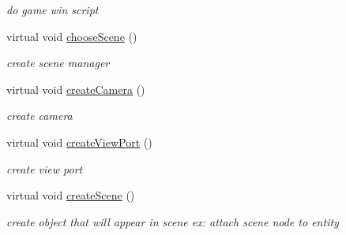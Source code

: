 \begin{DoxyCompactItemize}
\begin{DoxyCompactList}\small\item\em do game win script \end{DoxyCompactList}\item 
\hypertarget{class_stage3_ad5dbf1a992617368d059c960529db200}{
virtual void \hyperlink{class_stage3_ad5dbf1a992617368d059c960529db200}{chooseScene} ()}
\label{class_stage3_ad5dbf1a992617368d059c960529db200}

\begin{DoxyCompactList}\small\item\em create scene manager \end{DoxyCompactList}\item 
\hypertarget{class_stage3_ae5c7d751ff1b025a578c6f17aad30f3a}{
virtual void \hyperlink{class_stage3_ae5c7d751ff1b025a578c6f17aad30f3a}{createCamera} ()}
\label{class_stage3_ae5c7d751ff1b025a578c6f17aad30f3a}

\begin{DoxyCompactList}\small\item\em create camera \end{DoxyCompactList}\item 
\hypertarget{class_stage3_a754f8f932725d8088f5b22061a6ca581}{
virtual void \hyperlink{class_stage3_a754f8f932725d8088f5b22061a6ca581}{createViewPort} ()}
\label{class_stage3_a754f8f932725d8088f5b22061a6ca581}

\begin{DoxyCompactList}\small\item\em create view port \end{DoxyCompactList}\item 
\hypertarget{class_stage3_a20ebb6e09f42362e24f5662cc028d06a}{
virtual void \hyperlink{class_stage3_a20ebb6e09f42362e24f5662cc028d06a}{createScene} ()}
\label{class_stage3_a20ebb6e09f42362e24f5662cc028d06a}

\begin{DoxyCompactList}\small\item\em create object that will appear in scene ex: attach scene node to entity \end{DoxyCompactList}\end{DoxyCompactItemize}


